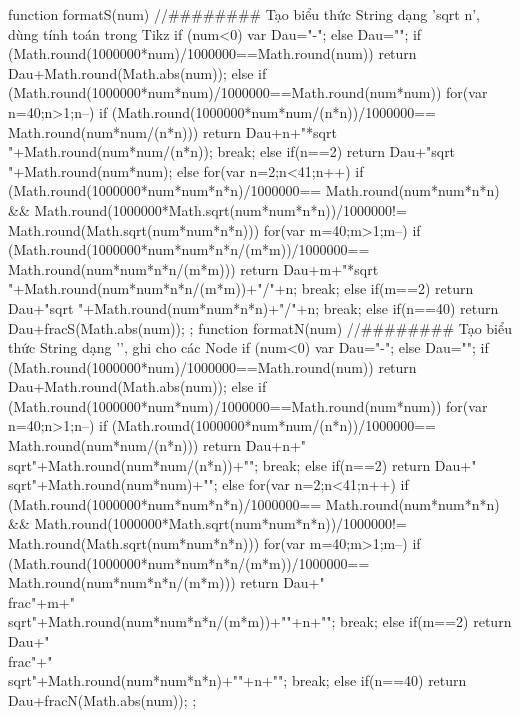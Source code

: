 function formatS(num){			//######## Tạo biểu thức String dạng 'sqrt n', dùng tính toán trong Tikz
	if (num<0) var Dau="-";
	else Dau="";
	if (Math.round(1000000*num)/1000000==Math.round(num))
	return Dau+Math.round(Math.abs(num));
	else if (Math.round(1000000*num*num)/1000000==Math.round(num*num)) {
		for(var n=40;n>1;n--){
			if (Math.round(1000000*num*num/(n*n))/1000000== Math.round(num*num/(n*n))) {
				return Dau+n+"*sqrt "+Math.round(num*num/(n*n));
				break;
			}
			else if(n==2) return Dau+"sqrt "+Math.round(num*num);
		}
	}
	else 
	for(var n=2;n<41;n++){
		if (Math.round(1000000*num*num*n*n)/1000000== Math.round(num*num*n*n) && Math.round(1000000*Math.sqrt(num*num*n*n))/1000000!= Math.round(Math.sqrt(num*num*n*n))) {
			for(var m=40;m>1;m--){
				if (Math.round(1000000*num*num*n*n/(m*m))/1000000== Math.round(num*num*n*n/(m*m))) {
					return Dau+m+"*sqrt "+Math.round(num*num*n*n/(m*m))+"/"+n;
					break;
				}
				else if(m==2) return Dau+"sqrt "+Math.round(num*num*n*n)+"/"+n;
			}
			break;
		}
		else if(n==40) return Dau+fracS(Math.abs(num));
	}
};
function formatN(num){			//######## Tạo biểu thức String dạng '', ghi cho các Node
	if (num<0) var Dau="-";
	else Dau="";
	if (Math.round(1000000*num)/1000000==Math.round(num))
	return Dau+Math.round(Math.abs(num));
	else if (Math.round(1000000*num*num)/1000000==Math.round(num*num)) {
		for(var n=40;n>1;n--){
			if (Math.round(1000000*num*num/(n*n))/1000000== Math.round(num*num/(n*n))) {
				return Dau+n+"\\sqrt{"+Math.round(num*num/(n*n))+"}";
				break;
			}
			else if(n==2) return Dau+"\\sqrt{"+Math.round(num*num)+"}";
		}
	}
	else 
	for(var n=2;n<41;n++){
		if (Math.round(1000000*num*num*n*n)/1000000== Math.round(num*num*n*n) && Math.round(1000000*Math.sqrt(num*num*n*n))/1000000!= Math.round(Math.sqrt(num*num*n*n))) {
			for(var m=40;m>1;m--){
				if (Math.round(1000000*num*num*n*n/(m*m))/1000000== Math.round(num*num*n*n/(m*m))) {
					return Dau+"\\frac{"+m+"\\sqrt{"+Math.round(num*num*n*n/(m*m))+"}}{"+n+"}";
					break;
				}
				else if(m==2) return Dau+"\\frac{"+"\\sqrt{"+Math.round(num*num*n*n)+"}}{"+n+"}";
			}
			break;
		}
		else if(n==40) return Dau+fracN(Math.abs(num));
	}
};

